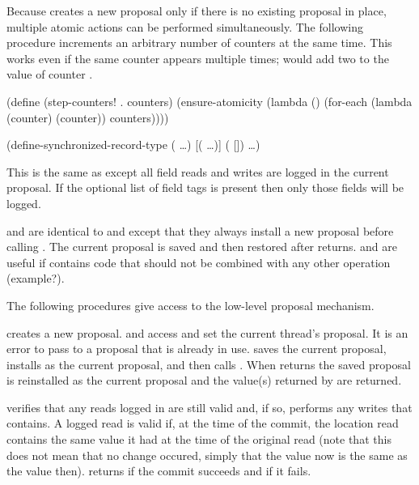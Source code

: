 Because  creates a new proposal only if there is
 no existing proposal in place, multiple atomic actions can be performed
 simultaneously.
The following procedure increments an arbitrary number of counters at the same
 time.
This works even if the same counter appears multiple times;
  would add two to the value of counter .
\begin{example}
(define (step-counters! . counters)
  (ensure-atomicity
    (lambda ()
      (for-each (lambda (counter)
                  (counter))
                counters))))
\end{example}

\begin{example}
(define-synchronized-record-type  
  (  \ldots)
  [(\cvar {} \ldots)]
  (  [])
  \ldots)
\end{example}
This is the same as 
 except all field reads and
 writes are logged in the current proposal.
If the optional list of field tags is present then only those fields will
 be logged.

\begin{protos}
\end{protos}
\noindent
{} and  are identical
 to  and  except that they
 always install a new proposal before calling .
The current proposal is saved and then restored after  returns.
 and  are useful if  contains
 code that should not be combined with any other operation (example?).

The following procedures give access to the low-level proposal mechanism.
\begin{protos}
\end{protos}
\noindent
{} creates a new proposal.
 and  access and set
 the current thread's proposal.
It is an error to pass to  a proposal that
 is already in use.
 saves the current proposal, installs  as
 the current proposal, and then calls .
When  returns the saved proposal is reinstalled as the current
 proposal
 and the value(s) returned by  are returned.

 verifies that any reads logged in  are
 still valid and, if so, performs any writes that  contains.
A logged read is valid if, at the time of the commit, the location read contains
 the same value it had at the time of the original read (note that this does
 not mean that no change occured, simply that the value now is the same as
 the value then).
 returns  if the commit succeeds and 
 if it fails.
